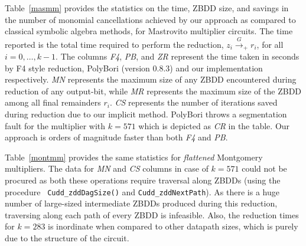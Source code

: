  
Table~\ref{masmm} provides the statistics on the time, ZBDD size, and
savings in the number of monomial cancellations achieved by our
approach as compared to classical symbolic algebra methods, for
Mastrovito multiplier circuits. The time reported is the total time
required to perform the reduction, $z_i \xrightarrow{G}_+ r_i$, for
all $i = 0,\dots,k-1$. The columns 
\textit{F4}, \textit{PB}, and \textit{ZR} represent the time taken in
seconds by F4 style reduction, PolyBori (version 0.8.3) and our
implementation respectively. \textit{MN} represents the maximum size
of any ZBDD encountered during reduction of any output-bit, while
\textit{MR} represents the maximum size of the ZBDD among all final
remainders $r_i$. \textit{CS} represents the
number of iterations saved during reduction due to our implicit
method. PolyBori throws a segmentation fault for the multiplier with
$k = 571$ which is depicted as \textit{CR} in the table. Our approach
is orders of magnitude faster than both \textit{F4} and \textit{PB}. 

Table~\ref{montmm} provides the same statistics for \textit{flattened}
Montgomery multipliers. The data for \textit{MN} and \textit{CS}
columns in  case of  $k=571$ could not be procured as both these
operations require traversal along ZBDDs (using the procedure {\tt
  Cudd\_zddDagSize()} and {\tt Cudd\_zddNextPath}). As there is a huge
number of large-sized intermediate ZBDDs produced during this
reduction, traversing along each path of every ZBDD is
infeasible. Also, the reduction times for $k=283$ is inordinate when
compared to other datapath sizes, which is purely due to  the
structure of the circuit.  




